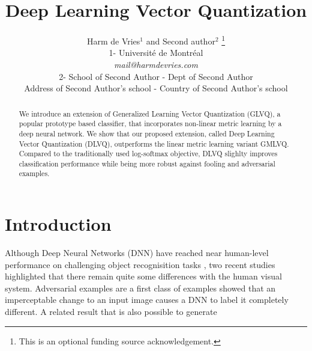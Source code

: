 \documentclass{esannV2}
\begin{document}
\title{Deep Learning Vector Quantization}

\author{Harm de Vries$^1$ and Second author$^2$
%
\thanks{This is an optional funding source acknowledgement.}
%
\vspace{.3cm}\\
%
1- Universit\'{e} de Montr\'{e}al \\
\textit{mail@harmdevries.com}
%
\vspace{.1cm}\\
2- School of Second Author - Dept of Second Author \\
Address of Second Author's school - Country of Second Author's school\\
}

\maketitle

\begin{abstract}
We introduce an extension of Generalized Learning Vector Quantization (GLVQ), a popular prototype based classifier, that incorporates non-linear metric learning by a deep neural network. We show that our proposed extension, called Deep Learning Vector Quantization (DLVQ), outperforms the linear metric learning variant GMLVQ. Compared to the traditionally used log-softmax objective, DLVQ slighlty improves classification performance while being more robust against fooling and adversarial examples. 
\end{abstract}

\section{Introduction}
Although Deep Neural Networks (DNN) \cite{DBLP:journals/corr/abs-1206-5538} have reached near human-level performance on challenging object recognisition tasks \cite{krizhevsky2012imagenet,DBLP:journals/corr/IoffeS15}, two recent studies \cite{DBLP:journals/corr/SzegedyZSBEGF13,DBLP:journals/corr/NguyenYC14} highlighted that there remain quite some differences with the human visual system. Adversarial examples are a first class of examples \cite{DBLP:journals/corr/SzegedyZSBEGF13} showed that an imperceptable change to an input image causes a DNN to label it completely different. A related result \cite{DBLP:journals/corr/NguyenYC14} that is also possible to generate 
\end{document}
